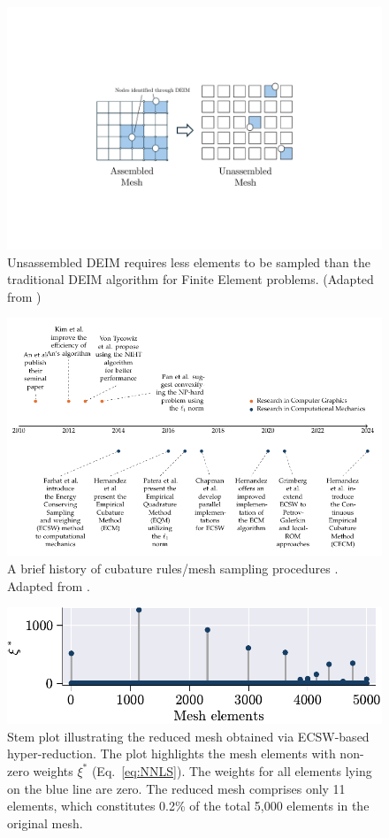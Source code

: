 \documentclass[11pt]{article}
\begin{document}
\begin{figure}[t]
    \centering
    \includegraphics[width=0.7\linewidth]{udeim2.pdf}
    \caption{Unsassembled DEIM requires less elements to be sampled than the traditional DEIM algorithm for Finite Element problems. (Adapted from \cite{tiso2013discrete})}
    \label{fig:UDEIM}
\end{figure}

\begin{figure}
    \centering
    \includegraphics[width=\linewidth]{PAT.pdf}
\caption{A brief history of cubature rules/mesh sampling procedures \cite{an2009optimizing,kim2013subspace,von2013efficient,pan2015subspace,farhat2014dimensional,chapman2016accelerated,Patera_2017_EQP,hernandez2020multiscale,grimberg2021mesh,hernandez2024cecm}. Adapted from \cite{bravo2024subspace}.}
\label{fig:PTA_LIT}
\end{figure}

\begin{figure}[t]
    \centering
    \includegraphics[width=0.8\linewidth]{reduced_mesh_ECSW_new.pdf}
    \caption{Stem plot illustrating the reduced mesh obtained via ECSW-based hyper-reduction. The plot highlights the mesh elements with non-zero weights $\xi^*$ (Eq.~\ref{eq:NNLS}). The weights for all elements lying on the blue line are zero. The reduced mesh comprises only 11 elements, which constitutes 0.2\% of the total 5,000 elements in the original mesh.}
    \label{fig:reduced_mesh_ecsw}
\end{figure}
\end{document}
